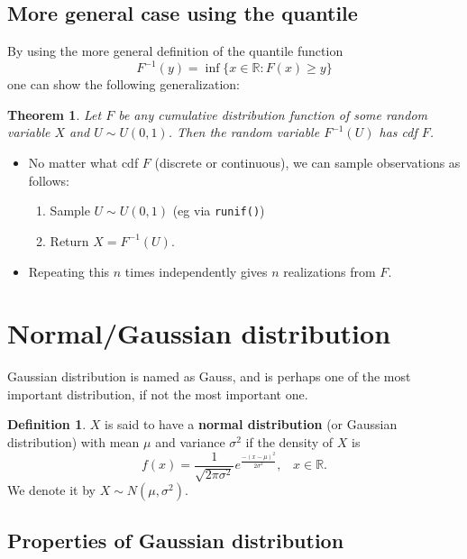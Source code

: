 \documentclass[
]{book}
\providecommand{\tightlist}{%
  \setlength{\itemsep}{0pt}\setlength{\parskip}{0pt}}
\newtheorem{theorem}{Theorem}[chapter]
\theoremstyle{definition}
\newtheorem{definition}{Definition}[chapter]
\theoremstyle{definition}
\theoremstyle{definition}
\theoremstyle{definition}
\theoremstyle{remark}
\begin{document}
\subsection{More general case using the quantile}\label{more-general-case-using-the-quantile}

By using the more general definition of the quantile function
\[F^{-1}(y) = \inf\{x\in\mathbb{R}: F(x)\geq y\}\]
one can show the following generalization:\pause

\begin{theorem}
Let \(F\) be any cumulative distribution function of some random variable \(X\) and \(U\sim U(0,1)\). Then the random variable \(F^{-1}(U)\) has cdf \(F\).
\end{theorem}

\begin{itemize}
\tightlist
\item
  No matter what cdf \(F\) (discrete or continuous), we can sample observations as follows:

  \begin{enumerate}
  \def\labelenumi{\alph{enumi}.}
  \tightlist
  \item
    Sample \(U\sim U(0,1)\) (eg via \texttt{runif()})
  \item
    Return \(X=F^{-1}(U)\).
  \end{enumerate}
\item
  Repeating this \(n\) times independently gives \(n\) realizations from \(F\).
\end{itemize}

\section{Normal/Gaussian distribution}\label{normalgaussian-distribution}

Gaussian distribution is named as Gauss, and is perhaps one of the most important distribution, if not the most important one.

\begin{definition}
\(X\) is said to have a \textbf{normal distribution} (or Gaussian distribution) with mean \(\mu\) and variance \(\sigma^2\) if the density of \(X\) is
\[
f(x) = \frac{1}{\sqrt{2\pi \sigma^2}} e^{\frac{-(x-\mu)^2}{2\sigma^2}}, \;\;\; x\in {\mathbb R}.
\]
We denote it by \(X\sim N(\mu,\sigma^2)\).
\end{definition}

\subsection{Properties of Gaussian distribution}\label{properties-of-gaussian-distribution}
\end{document}
